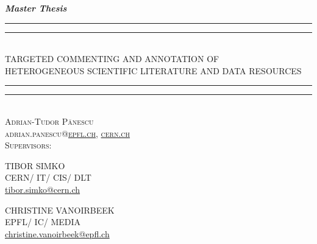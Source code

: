 
\begin{titlepage}
  \centering
  \vspace*{5\baselineskip}
  \textbf{\textit{Master Thesis}}
  \\\vspace*{\baselineskip}
  \rule{\textwidth}{1.6pt}\vspace*{-\baselineskip}\vspace*{2pt}
  \rule{\textwidth}{0.4pt}\\[\baselineskip]
  {TARGETED COMMENTING AND ANNOTATION OF\\[0.3\baselineskip] HETEROGENEOUS SCIENTIFIC LITERATURE AND DATA RESOURCES}
  \rule{\textwidth}{0.4pt}\vspace*{-\baselineskip}\vspace{3.2pt}
  \rule{\textwidth}{1.6pt}\\[\baselineskip]
  \scshape
  \vspace*{2\baselineskip}
  Adrian-Tudor P\u{a}nescu\\
  adrian.panescu@\href{mailto:adrian.panescu@epfl.ch}{epfl.ch},
                 \href{mailto:adrian.panescu@cern.ch}{cern.ch}
  \\\vspace*{4\baselineskip}
  Supervisors:
  \\\vspace*{1\baselineskip}
  \begin{minipage}{0.4\textwidth}
    \centering
    TIBOR SIMKO\\
    CERN/ IT/ CIS/ DLT\\
    \href{mailto:tibor.simko@cern.ch}{tibor.simko@cern.ch}
  \end{minipage}
  \begin{minipage}{0.4\textwidth}
    \centering
    CHRISTINE VANOIRBEEK\\
    EPFL/ IC/ MEDIA\\
    \href{mailto:christine.vanoirbeek@epfl.ch}{christine.vanoirbeek@epfl.ch}
  \end{minipage}
  \vfill
  \begin{minipage}{0.4\textwidth}
    \centering

\end{minipage}
\end{titlepage}
